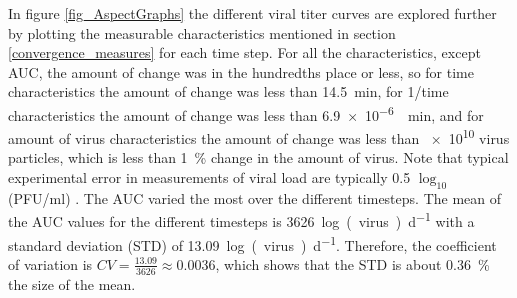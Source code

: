 In figure \ref{fig_AspectGraphs} the different viral titer curves are explored further by plotting the measurable characteristics mentioned in section \ref{convergence_measures} for each time step. For all the characteristics, except AUC, the amount of change was in the hundredths place or less, so for time characteristics the amount of change was less than \SI{14.5}{\minute}, for 1/time characteristics the amount of change was less than \SI{6.9e-6}{\per\minute}, and for amount of virus characteristics the amount of change was less than \num{e10} virus particles, which is less than \SI{1}{\percent} change in the amount of virus. Note that typical experimental error in measurements of viral load are typically 0.5 $\log_{10}$(PFU/ml) \citep{labarre01}. The AUC varied the most over the different timesteps. The mean of the AUC values for the different timesteps is \SI{3626}{log(virus)\per\day} with a standard deviation (STD) of \SI{13.09}{log(virus)\per\day}. Therefore, the coefficient of variation is $CV = \frac{13.09}{3626} \approx 0.0036$, which shows that the STD is about \SI{0.36}{\percent} the size of the mean.

